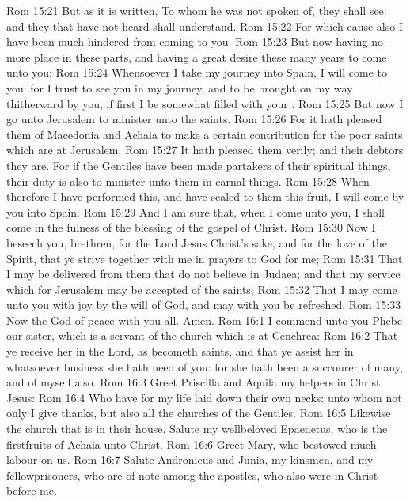 \vs Rom 15:21 But as it is written, To whom he was not spoken of, they shall see: and they that have not heard shall understand.
\vs Rom 15:22 For which cause also I have been much hindered from coming to you.
\vs Rom 15:23 But now having no more place in these parts, and having a great desire these many years to come unto you;
\vs Rom 15:24 Whensoever I take my journey into Spain, I will come to you: for I trust to see you in my journey, and to be brought on my way thitherward by you, if first I be somewhat filled with your .
\vs Rom 15:25 But now I go unto Jerusalem to minister unto the saints.
\vs Rom 15:26 For it hath pleased them of Macedonia and Achaia to make a certain contribution for the poor saints which are at Jerusalem.
\vs Rom 15:27 It hath pleased them verily; and their debtors they are. For if the Gentiles have been made partakers of their spiritual things, their duty is also to minister unto them in carnal things.
\vs Rom 15:28 When therefore I have performed this, and have sealed to them this fruit, I will come by you into Spain.
\vs Rom 15:29 And I am sure that, when I come unto you, I shall come in the fulness of the blessing of the gospel of Christ.
\vs Rom 15:30 Now I beseech you, brethren, for the Lord Jesus Christ's sake, and for the love of the Spirit, that ye strive together with me in  prayers to God for me;
\vs Rom 15:31 That I may be delivered from them that do not believe in Judaea; and that my service which  for Jerusalem may be accepted of the saints;
\vs Rom 15:32 That I may come unto you with joy by the will of God, and may with you be refreshed.
\vs Rom 15:33 Now the God of peace  with you all. Amen.
\vs Rom 16:1 I commend unto you Phebe our sister, which is a servant of the church which is at Cenchrea:
\vs Rom 16:2 That ye receive her in the Lord, as becometh saints, and that ye assist her in whatsoever business she hath need of you: for she hath been a succourer of many, and of myself also.
\vs Rom 16:3 Greet Priscilla and Aquila my helpers in Christ Jesus:
\vs Rom 16:4 Who have for my life laid down their own necks: unto whom not only I give thanks, but also all the churches of the Gentiles.
\vs Rom 16:5 Likewise  the church that is in their house. Salute my wellbeloved Epaenetus, who is the firstfruits of Achaia unto Christ.
\vs Rom 16:6 Greet Mary, who bestowed much labour on us.
\vs Rom 16:7 Salute Andronicus and Junia, my kinsmen, and my fellowprisoners, who are of note among the apostles, who also were in Christ before me.
